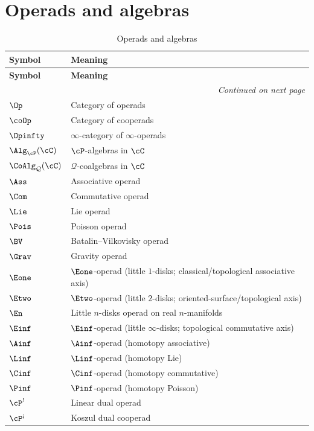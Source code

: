 \section{Operads and algebras}
\label{sec:notation-operads}

\begin{longtable}{p{3cm} p{10cm}}
\caption{Operads and algebras} \\
\toprule
\textbf{Symbol} & \textbf{Meaning} \\
\midrule
\endfirsthead
\toprule
\textbf{Symbol} & \textbf{Meaning} \\
\midrule
\endhead
\midrule
\multicolumn{2}{r}{\textit{Continued on next page}} \\
\endfoot
\bottomrule
\endlastfoot

$\Op$ & Category of operads \\
$\coOp$ & Category of cooperads \\
$\Opinfty$ & $\infty$-category of $\infty$-operads \\
$\Alg_\cP(\cC)$ & $\cP$-algebras in $\cC$ \\
$\CoAlg_{\mathcal{Q}}(\cC)$ & $\mathcal{Q}$-coalgebras in $\cC$ \\
$\Ass$ & Associative operad \\
$\Com$ & Commutative operad \\
$\Lie$ & Lie operad \\
$\Pois$ & Poisson operad \\
$\BV$ & Batalin--Vilkovisky operad \\
$\Grav$ & Gravity operad \\
%
$\Eone$ & $\Eone$-operad (little $1$-disks; classical/topological associative axis) \\
$\Etwo$ & $\Etwo$-operad (little $2$-disks; oriented-surface/topological axis) \\
$\En$ & Little $n$-disks operad on real $n$-manifolds \\
$\Einf$ & $\Einf$-operad (little $\infty$-disks; topological commutative axis) \\
$\Ainf$ & $\Ainf$-operad (homotopy associative) \\
%
$\Linf$ & $\Linf$-operad (homotopy Lie) \\
$\Cinf$ & $\Cinf$-operad (homotopy commutative) \\
$\Pinf$ & $\Pinf$-operad (homotopy Poisson) \\
$\cP^!$ & Linear dual operad \\
$\cP^{\scriptstyle \text{\textexclamdown}}$ & Koszul dual cooperad \\

\end{longtable}

